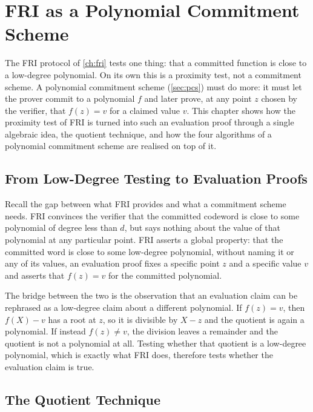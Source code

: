 \chapter{FRI as a Polynomial Commitment Scheme}
\label{ch:pcs}

The FRI protocol of \cref{ch:fri} tests one thing: that a committed
function is close to a low-degree polynomial. On its own this is a
proximity test, not a commitment scheme. A polynomial commitment scheme
(\cref{sec:pcs}) must do more: it must let the prover commit to a
polynomial $f$ and later prove, at any point $z$ chosen by the verifier,
that $f(z) = v$ for a claimed value $v$. This chapter shows how the
proximity test of FRI is turned into such an evaluation proof through a
single algebraic idea, the quotient technique, and how the four
algorithms of a polynomial commitment scheme are realised on top of it.


\section{From Low-Degree Testing to Evaluation Proofs}
\label{sec:ldt_to_eval}

Recall the gap between what FRI provides and what a commitment scheme
needs. FRI convinces the verifier that the committed codeword is close to
some polynomial of degree less than $d$, but says nothing about the value
of that polynomial at any particular point. FRI
asserts a global property: that the committed word is close to some
low-degree polynomial, without naming it or any of its values, an 
evaluation proof fixes a specific point $z$ and a specific value $v$ 
and asserts that $f(z) = v$ for the committed polynomial.

The bridge between the two is the observation that an evaluation claim can
be rephrased as a low-degree claim about a different polynomial. If
$f(z) = v$, then $f(X) - v$ has a root at $z$, so it is divisible by
$X - z$ and the quotient is again a polynomial. If instead
$f(z) \neq v$, the division leaves a remainder and the quotient is not a
polynomial at all. Testing whether that quotient is a low-degree
polynomial, which is exactly what FRI does, therefore tests whether the
evaluation claim is true. 


\section{The Quotient Technique}
\label{sec:quotient}

